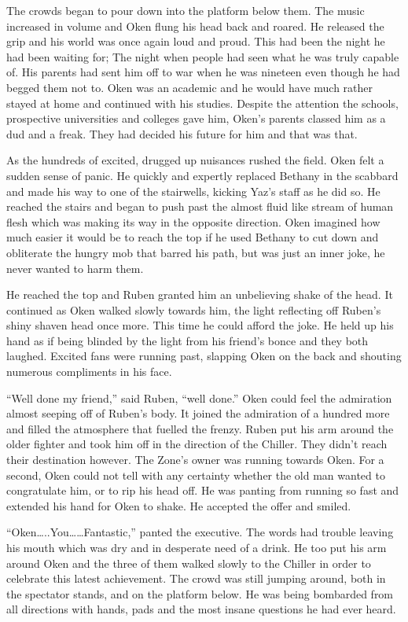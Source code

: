 The crowds began to pour down into the platform below them. The music increased in volume and Oken flung his head back and roared. He released the grip and his world was once again loud and proud. This had been the night he had been waiting for; The night when people had seen what he was truly capable of. His parents had sent him off to war when he was nineteen even though he had begged them not to. Oken was an academic and he would have much rather stayed at home and continued with his studies. Despite the attention the schools, prospective universities and colleges gave him, Oken's parents classed him as a dud and a freak. They had decided his future for him and that was that.

As the hundreds of excited, drugged up nuisances rushed the field. Oken felt a sudden sense of panic. He quickly and expertly replaced Bethany in the scabbard and made his way to one of the stairwells, kicking Yaz's staff as he did so. He reached the stairs and began to push past the almost fluid like stream of human flesh which was making its way in the opposite direction. Oken imagined how much easier it would be to reach the top if he used Bethany to cut down and obliterate the hungry mob that barred his path, but was just an inner joke, he never wanted to harm them.

He reached the top and Ruben granted him an unbelieving shake of the head. It continued as Oken walked slowly towards him, the light reflecting off Ruben's shiny shaven head once more. This time he could afford the joke. He held up his hand as if being blinded by the light from his friend's bonce and they both laughed. Excited fans were running past, slapping Oken on the back and shouting numerous compliments in his face.

``Well done my friend,'' said Ruben, ``well done.'' Oken could feel the admiration almost seeping off of Ruben's body. It joined the admiration of a hundred more and filled the atmosphere that fuelled the frenzy. Ruben put his arm around the older fighter and took him off in the direction of the Chiller. They didn't reach their destination however. The Zone's owner was running towards Oken. For a second, Oken could not tell with any certainty whether the old man wanted to congratulate him, or to rip his head off. He was panting from running so fast and extended his hand for Oken to shake. He accepted the offer and smiled.

``Oken…..You……Fantastic,'' panted the executive. The words had trouble leaving his mouth which was dry and in desperate need of a drink. He too put his arm around Oken and the three of them walked slowly to the Chiller in order to celebrate this latest achievement. The crowd was still jumping around, both in the spectator stands, and on the platform below. He was being bombarded from all directions with hands, pads and the most insane questions he had ever heard.

